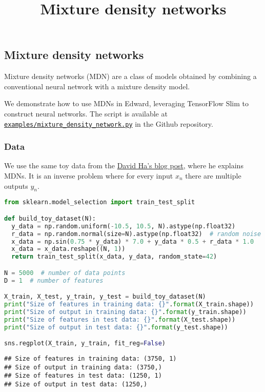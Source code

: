 \title{Mixture density networks}

\subsection{Mixture density networks}

Mixture density networks (MDN) \citep{bishop1994mixture} are a class
of models obtained by combining a conventional neural network with a
mixture density model.

We demonstrate how to use MDNs in Edward, leveraging TensorFlow Slim
to construct neural networks.
The script is available at
\href{https://github.com/blei-lab/edward/blob/master/examples/mixture_density_network.py}
{\texttt{examples/mixture_density_network.py}} in the Github repository.

\subsubsection{Data}

We use the same toy data from the
\href{http://blog.otoro.net/2015/11/24/mixture-density-networks-with-tensorflow/}{David
Ha's blog post}, where he explains MDNs. It is an inverse problem where
for every input $x_n$ there are multiple outputs $y_n$.

\begin{lstlisting}[language=Python]
from sklearn.model_selection import train_test_split

def build_toy_dataset(N):
  y_data = np.random.uniform(-10.5, 10.5, N).astype(np.float32)
  r_data = np.random.normal(size=N).astype(np.float32)  # random noise
  x_data = np.sin(0.75 * y_data) * 7.0 + y_data * 0.5 + r_data * 1.0
  x_data = x_data.reshape((N, 1))
  return train_test_split(x_data, y_data, random_state=42)

N = 5000  # number of data points
D = 1  # number of features

X_train, X_test, y_train, y_test = build_toy_dataset(N)
print("Size of features in training data: {}".format(X_train.shape))
print("Size of output in training data: {}".format(y_train.shape))
print("Size of features in test data: {}".format(X_test.shape))
print("Size of output in test data: {}".format(y_test.shape))

sns.regplot(X_train, y_train, fit_reg=False)
\end{lstlisting}

\begin{lstlisting}
## Size of features in training data: (3750, 1)
## Size of output in training data: (3750,)
## Size of features in test data: (1250, 1)
## Size of output in test data: (1250,)
\end{lstlisting}

